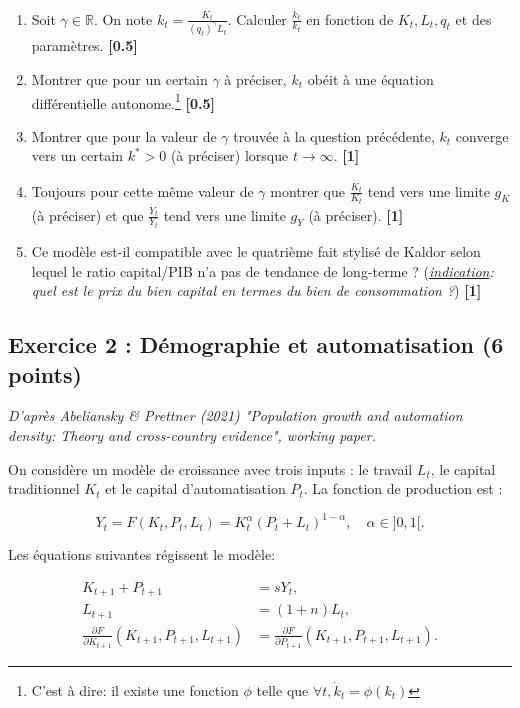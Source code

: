 \documentclass[a4paper,12pt]{article}
\begin{document}
\begin{enumerate}
    \item Soit $\gamma \in \mathbb{R}$. On note $k_t = \frac{K_t}{(q_t)^\gamma L_t}$. Calculer $\frac{\dot{k_t}}{k_t}$ en fonction de $K_t, L_t, q_t$ et des paramètres. \hfill \textbf{[0.5]}
    \item Montrer que pour un certain $\gamma$ à préciser, $k_t$ obéit à une équation différentielle autonome.\footnote{C'est à dire: il existe une fonction $\phi$ telle que $\forall t, \dot{k}_t = \phi(k_t)$} \hfill \textbf{[0.5]}  
    \item Montrer que pour la valeur de $\gamma$ trouvée à la question précédente, $k_t$ converge vers un certain $k^* > 0$ (à préciser) lorsque $t \to \infty$. \hfill \textbf{[1]}
    \item Toujours pour cette même valeur de $\gamma$ montrer que $\frac{\dot{K_t}}{K_t}$ tend vers une limite $g_K$ (à préciser) et que $\frac{\dot{Y_t}}{Y_t}$ tend vers une limite $g_Y$ (à préciser). \hfill \textbf{[1]}  
    \item Ce modèle est-il compatible avec le quatrième fait stylisé de Kaldor selon lequel le ratio capital/PIB n’a pas de tendance de long-terme ? (\emph{\underline{indication}: quel est le prix du bien capital en termes du bien de consommation ?}) \hfill \textbf{[1]}  
\end{enumerate}

\subsection*{Exercice 2 : Démographie et automatisation (6 points)}

\emph{D’après Abeliansky \& Prettner (2021) "Population growth and automation density: Theory and cross-country evidence", working paper.}

\hfill

On considère un modèle de croissance avec trois inputs : le travail $L_t$, le capital traditionnel $K_t$ et le capital d’automatisation $P_t$. La fonction de production est :

\begin{equation}
    Y_t = F(K_t, P_t, L_t) = K_t^{\alpha} (P_t + L_t)^{1-\alpha}, \quad \alpha \in ]0,1[.
\end{equation}

Les équations suivantes régissent le modèle:

\begin{align}
    K_{t+1} + P_{t+1} &= s Y_t, \\
    L_{t+1} &= (1 + n)L_t, \\
    \frac{\partial F}{\partial K_{t+1}} (K_{t+1}, P_{t+1}, L_{t+1}) &= \frac{\partial F}{\partial P_{t+1}} (K_{t+1}, P_{t+1}, L_{t+1}).
\end{align}
\end{document}
